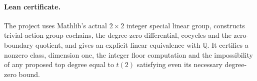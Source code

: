 \documentclass[11pt]{article}
\begin{document}
\paragraph{Lean certificate.}
The project uses Mathlib's actual $2\times2$ integer special linear group,
constructs trivial-action group cochains, the degree-zero differential,
cocycles and the zero-boundary quotient, and gives an explicit linear
equivalence with $\mathbb Q$. It certifies a nonzero class, dimension one,
the integer floor computation and the impossibility of any proposed top
degree equal to $t(2)$ satisfying even its necessary degree-zero bound.
\end{document}
